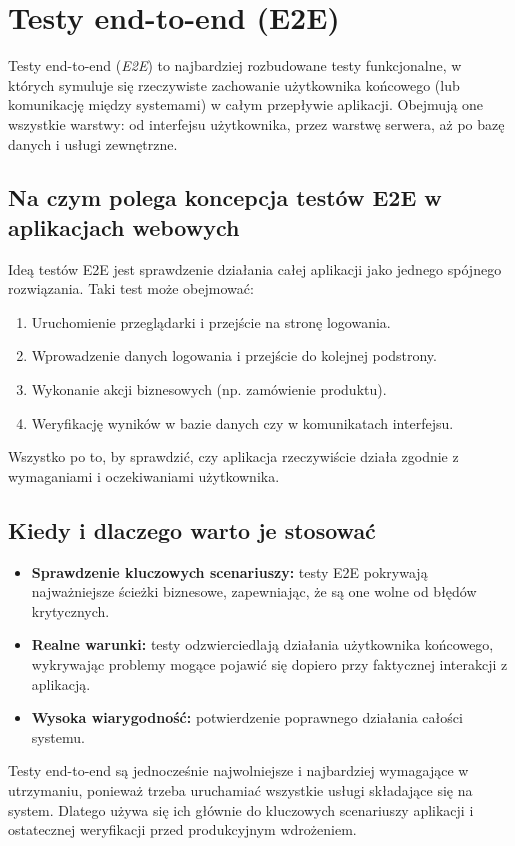\documentclass[12pt]{report}
\begin{document}
\section{Testy end-to-end (E2E)}
\label{sec:testy-end-to-end}
Testy end-to-end (\emph{E2E}) to najbardziej rozbudowane testy funkcjonalne, w których symuluje się rzeczywiste zachowanie użytkownika końcowego (lub komunikację między systemami) w całym przepływie aplikacji. Obejmują one wszystkie warstwy: od interfejsu użytkownika, przez warstwę serwera, aż po bazę danych i usługi zewnętrzne.

\subsection*{Na czym polega koncepcja testów E2E w aplikacjach webowych}
Ideą testów E2E jest sprawdzenie działania całej aplikacji jako jednego spójnego rozwiązania. Taki test może obejmować:
\begin{enumerate}
    \item Uruchomienie przeglądarki i przejście na stronę logowania.
    \item Wprowadzenie danych logowania i przejście do kolejnej podstrony.
    \item Wykonanie akcji biznesowych (np. zamówienie produktu).
    \item Weryfikację wyników w bazie danych czy w komunikatach interfejsu.
\end{enumerate}
Wszystko po to, by sprawdzić, czy aplikacja rzeczywiście działa zgodnie z wymaganiami i oczekiwaniami użytkownika.

\subsection*{Kiedy i dlaczego warto je stosować}
\begin{itemize}
    \item \textbf{Sprawdzenie kluczowych scenariuszy:} testy E2E pokrywają najważniejsze ścieżki biznesowe, zapewniając, że są one wolne od błędów krytycznych.
    \item \textbf{Realne warunki:} testy odzwierciedlają działania użytkownika końcowego, wykrywając problemy mogące pojawić się dopiero przy faktycznej interakcji z aplikacją.
    \item \textbf{Wysoka wiarygodność:} potwierdzenie poprawnego działania całości systemu.
\end{itemize}
Testy end-to-end są jednocześnie najwolniejsze i najbardziej wymagające w utrzymaniu, ponieważ trzeba uruchamiać wszystkie usługi składające się na system. Dlatego używa się ich głównie do kluczowych scenariuszy aplikacji i ostatecznej weryfikacji przed produkcyjnym wdrożeniem.
\end{document}
